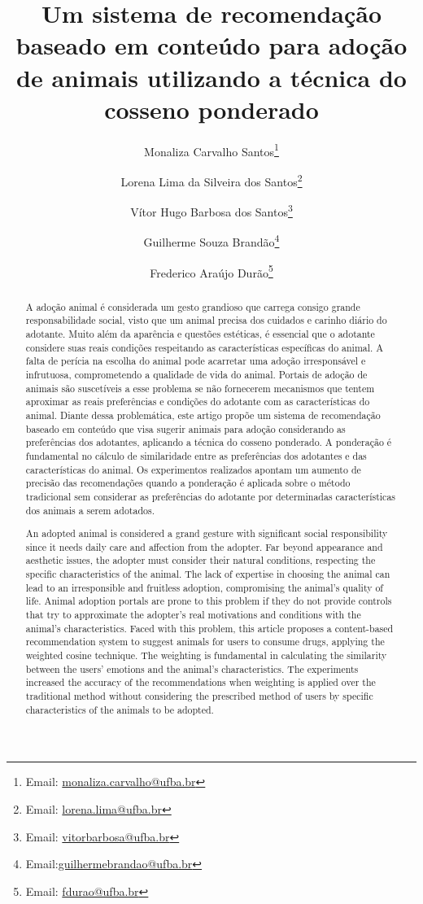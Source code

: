 \documentclass[portuguese]{textolivre}
\title{Um sistema de recomendação baseado em conteúdo para adoção de animais utilizando a técnica do cosseno ponderado}
\author[1]{Monaliza Carvalho Santos\orcid{0000-0001-7117-812X}\thanks{Email: \href{mailto:monaliza.carvalho@ufba.br}{monaliza.carvalho@ufba.br}}}
\author[1]{Lorena Lima da Silveira dos Santos\orcid{0009-0005-8295-3976}\thanks{Email: \href{mailto:lorena.lima@ufba.br}{lorena.lima@ufba.br}}}
\author[1]{Vítor Hugo Barbosa dos Santos\orcid{0000-0002-1771-2624}\thanks{Email: \href{mailto:vitorbarbosa@ufba.br}{vitorbarbosa@ufba.br}}}
\author[1]{Guilherme Souza Brandão\orcid{0000-0002-7217-0231}\thanks{Email:\href{mailto:guilhermebrandao@ufba.br}{guilhermebrandao@ufba.br}}}
\author[1]{Frederico Araújo Durão\orcid{0000-0002-7766-6666}\thanks{Email: \href{mailto:fdurao@ufba.br}{fdurao@ufba.br}}}
\affil[1]{Universidade Federal da Bahia, Salvador, BA, Brasil.}
\begin{document}
\maketitle


\begin{polyabstract}
\begin{abstract}
A adoção animal é considerada um gesto grandioso que carrega consigo grande responsabilidade social, visto que um animal precisa dos cuidados e carinho diário do adotante. Muito além da aparência e questões estéticas, é essencial que o adotante considere suas reais condições respeitando as características específicas do animal. A falta de perícia na escolha do animal pode acarretar uma adoção irresponsável e infrutuosa, comprometendo a qualidade de vida do animal. Portais de adoção de animais são suscetíveis a esse problema se não fornecerem mecanismos que tentem aproximar as reais preferências e condições do adotante com as características do animal. Diante dessa problemática, este artigo propõe um sistema de recomendação baseado em conteúdo que visa sugerir animais para adoção considerando as preferências dos adotantes, aplicando a técnica do cosseno ponderado. A ponderação é fundamental no cálculo de similaridade entre as preferências dos adotantes e das características do animal. Os experimentos realizados apontam um aumento de precisão das recomendações quando a ponderação é aplicada sobre o método tradicional sem considerar as preferências do adotante por determinadas características dos animais a serem adotados. 

\end{abstract}

\begin{english}
\begin{abstract}
An adopted animal is considered a grand gesture with significant social responsibility since it needs daily care and affection from the adopter. Far beyond appearance and aesthetic issues, the adopter must consider their natural conditions, respecting the specific characteristics of the animal. The lack of expertise in choosing the animal can lead to an irresponsible and fruitless adoption, compromising the animal's quality of life. Animal adoption portals are prone to this problem if they do not provide controls that try to approximate the adopter's real motivations and conditions with the animal's characteristics. Faced with this problem, this article proposes a content-based recommendation system to suggest animals for users to consume drugs, applying the weighted cosine technique. The weighting is fundamental in calculating the similarity between the users' emotions and the animal's characteristics. The experiments increased the accuracy of the recommendations when weighting is applied over the traditional method without considering the prescribed method of users by specific characteristics of the animals to be adopted.


\end{abstract}
\end{english}
\end{polyabstract}
\end{document}

